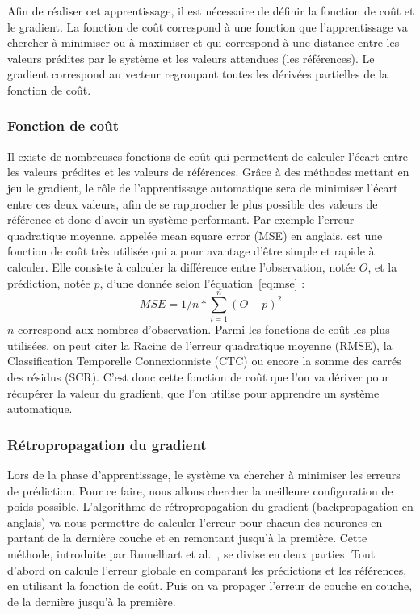 Afin de réaliser cet apprentissage, il est nécessaire de définir la fonction de coût et le gradient.
La fonction de coût correspond à une fonction que l'apprentissage va chercher à minimiser ou à maximiser et qui correspond à une distance entre les valeurs prédites par le système et les valeurs attendues (les références). Le gradient correspond au vecteur regroupant toutes les dérivées partielles de la fonction de coût.

\subsubsection{Fonction de coût}
Il existe de nombreuses fonctions de coût qui permettent de calculer l'écart entre les valeurs prédites et les valeurs de références. Grâce à des méthodes mettant en jeu le gradient, le rôle de l'apprentissage automatique sera de minimiser l'écart entre ces deux valeurs, afin de se rapprocher le plus possible des valeurs de référence et donc d'avoir un système performant.
Par exemple l'erreur quadratique moyenne, appelée mean square error (MSE) en anglais, est une fonction de coût très utilisée qui a pour avantage d'être simple et rapide à calculer. Elle consiste à calculer la différence entre l'observation, notée $O$, et la prédiction, notée $p$, d'une donnée selon l'équation~\ref{eq:mse} :
\begin{equation}
  MSE = 1/n*\sum_{i=1}^{n}(O-p)^2
  \label{eq:mse}
\end{equation}
$n$ correspond aux nombres d'observation. Parmi les fonctions de coût les plus utilisées, on peut citer la Racine de l'erreur quadratique moyenne (RMSE), la Classification Temporelle Connexionniste (CTC) ou encore la somme des carrés des résidus (SCR). C'est donc cette fonction de coût que l'on va dériver pour récupérer la valeur du gradient, que l'on utilise pour apprendre un système automatique.

\subsubsection{Rétropropagation du gradient}

Lors de la phase d'apprentissage, le système va chercher à minimiser les erreurs de prédiction. Pour ce faire, nous allons chercher la meilleure configuration de poids possible. L'algorithme de rétropropagation du gradient (backpropagation en anglais) va nous permettre de calculer l'erreur pour chacun des neurones en partant de la dernière couche et en remontant jusqu'à la première. Cette méthode, introduite par Rumelhart et al.~\cite{Rumelhart1986}, se divise en deux parties. Tout d'abord on calcule l'erreur globale en comparant les prédictions et les références, en utilisant la fonction de coût. Puis on va propager l'erreur de couche en couche, de la dernière jusqu'à la première.

